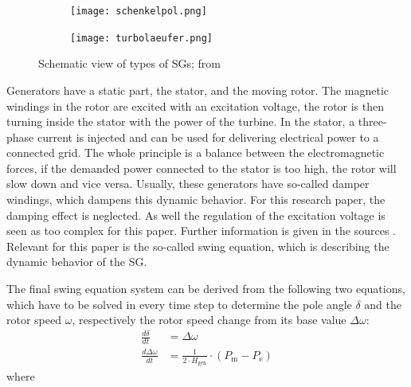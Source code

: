 \begin{figure}[H]
        \centering
        \begin{subfigure}[b]{.49\textwidth}
                \centering
                \texttt{[image: schenkelpol.png]}
        \end{subfigure}
        \begin{subfigure}[b]{.49\textwidth}
                \centering
                \texttt{[image: turbolaeufer.png]}
        \end{subfigure}
        \caption[Types of \acfp{SG}]{Schematic view of types of \acfp{SG}; from \autocite{oedingElektrischeKraftwerkeUnd2016}}
        \label{fig:generators}
\end{figure}

Generators have a static part, the stator, and the moving rotor. The magnetic windings in the rotor are excited with an excitation voltage, the rotor is then turning inside the stator with the power of the turbine. In the stator, a three-phase current is injected and can be used for delivering electrical power to a connected grid. The whole principle is a balance between the electromagnetic forces, if the demanded power connected to the stator is too high, the rotor will slow down and vice versa. Usually, these generators have so-called damper windings, which dampens this dynamic behavior. For this research paper, the damping effect is neglected. As well the regulation of the excitation voltage is seen as too complex for this paper. Further information is given in the sources \autocite{machowskiPowerSystemDynamics2020,kundurPowerSystemStability2022,oedingElektrischeKraftwerkeUnd2016,schwabElektroenergiesystemeSmarteStromversorgung2022}. Relevant for this paper is the so-called swing equation, which is describing the dynamic behavior of the \acs{SG}.

The final swing equation system can be derived from the following two equations, which have to be solved in every time step to determine the pole angle $\delta$ and the rotor speed $\omega$, respectively the rotor speed change from its base value $\Delta\omega$:
\begin{align}
        \frac{d\delta}{dt}       & =\Delta\omega \label{eq:swing1}                                                         \\[12pt]
        \frac{d\Delta\omega}{dt} & =\frac{1}{2 \cdot H_\mathrm{gen}} \cdot (P_\mathrm{m} - P_\mathrm{e}) \label{eq:swing2}
\end{align}
where

